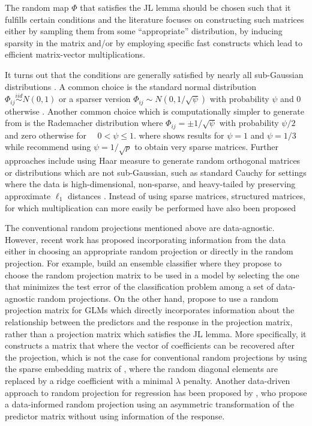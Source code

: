 \documentclass[
  article]{jss}
\begin{document}
The random map \(\Phi\) that satisfies the JL lemma should be chosen
such that it fulfills certain conditions
\citep[see][]{JohnsonLindenstrauss1984} and the literature focuses on
constructing such matrices either by sampling them from some
``appropriate'' distribution, by inducing sparsity in the matrix and/or
by employing specific fast constructs which lead to efficient
matrix-vector multiplications.

It turns out that the conditions are generally satisfied by nearly all
sub-Gaussian distributions \citep{matouvsek2008variants}. A common
choice is the standard normal distribution
\(\Phi_{ij} \overset{iid}{\sim} N(0,1)\) \citep{FRANKL1988JLSphere} or a
sparser version \(\Phi_{ij}{\sim} N(0,1/\sqrt{\psi})\) with probability
\(\psi\) and \(0\) otherwise \citep{matouvsek2008variants}. Another
common choice which is computationally simpler to generate from is the
Rademacher distribution where \(\Phi_{ij} =  \pm 1/\sqrt{\psi}\) with
probability \(\psi/2\) and zero otherwise for \(\quad 0<\psi\leq 1\).
where \citet{ACHLIOPTAS2003JL} shows results for \(\psi=1\) and
\(\psi=1/3\) while \citet{LiHastie2006VerySparseRP} recommend using
\(\psi=1/\sqrt{p}\) to obtain very sparse matrices. Further approaches
include using Haar measure to generate random orthogonal matrices
\citep{cannings2017random} or distributions which are not sub-Gaussian,
such as standard Cauchy for settings where the data is high-dimensional,
non-sparse, and heavy-tailed by preserving approximate \(\ell_1\)
distances \citep[see e.g.,][]{li2007nonlinear}. Instead of using sparse
matrices, structured matrices, for which multiplication can more easily
be performed have also been proposed \citep[see
e.g.,][]{ailon2009fast, Clarkson2013LowRankApproxShort}

The conventional random projections mentioned above are data-agnostic.
However, recent work has proposed incorporating information from the
data either in choosing an appropriate random projection or directly in
the random projection. For example, \citet{cannings2017random} build an
ensemble classifier where they propose to choose the random projection
matrix to be used in a model by selecting the one that minimizes the
test error of the classification problem among a set of data-agnostic
random projections. On the other hand, \citet{parzer2024glms} propose to
use a random projection matrix for GLMs which directly incorporates
information about the relationship between the predictors and the
response in the projection matrix, rather than a projection matrix which
satisfies the JL lemma. More specifically, it constructs a matrix that
where the vector of coefficients can be recovered after the projection,
which is not the case for conventional random projections
\citep{Thanei2017RPforHDR} by using the sparse embedding matrix of
\citet{Clarkson2013LowRankApproxShort}, where the random diagonal
elements are replaced by a ridge coefficient with a minimal \(\lambda\)
penalty. Another data-driven approach to random projection for
regression has been proposed by \citet{ryder2019asymmetric}, who propose
a data-informed random projection using an asymmetric transformation of
the predictor matrix without using information of the response.
\end{document}
